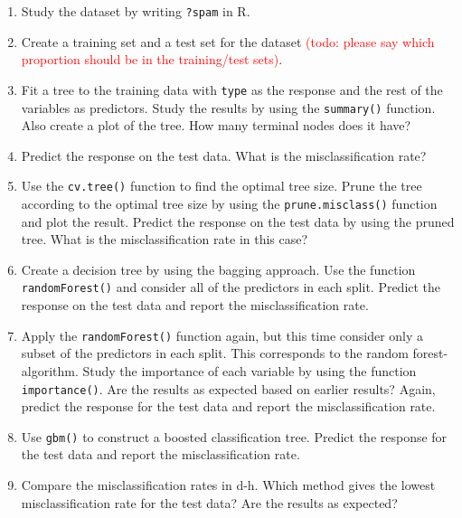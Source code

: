 \documentclass[]{article}
\begin{document}
\begin{enumerate}
\def\labelenumi{\alph{enumi})}
\item
  Study the dataset by writing \texttt{?spam} in R.
\item
  Create a training set and a test set for the dataset
  \textcolor{red}{(todo: please say which proportion should be in the training/test sets)}.
\item
  Fit a tree to the training data with \texttt{type} as the response and
  the rest of the variables as predictors. Study the results by using
  the \texttt{summary()} function. Also create a plot of the tree. How
  many terminal nodes does it have?
\item
  Predict the response on the test data. What is the misclassification
  rate?
\item
  Use the \texttt{cv.tree()} function to find the optimal tree size.
  Prune the tree according to the optimal tree size by using the
  \texttt{prune.misclass()} function and plot the result. Predict the
  response on the test data by using the pruned tree. What is the
  misclassification rate in this case?
\item
  Create a decision tree by using the bagging approach. Use the function
  \texttt{randomForest()} and consider all of the predictors in each
  split. Predict the response on the test data and report the
  misclassification rate.
\item
  Apply the \texttt{randomForest()} function again, but this time
  consider only a subset of the predictors in each split. This
  corresponds to the random forest-algorithm. Study the importance of
  each variable by using the function \texttt{importance()}. Are the
  results as expected based on earlier results? Again, predict the
  response for the test data and report the misclassification rate.
\item
  Use \texttt{gbm()} to construct a boosted classification tree. Predict
  the response for the test data and report the misclassification rate.
\item
  Compare the misclassification rates in d-h. Which method gives the
  lowest misclassification rate for the test data? Are the results as
  expected?
\end{enumerate}
\end{document}
